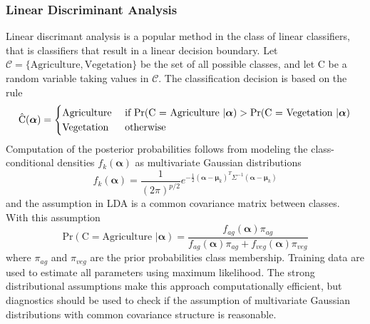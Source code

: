 \subsubsection{Linear Discriminant Analysis} %
\label{sub:LDA}
Linear discrimant analysis is a popular method in the class of linear classifiers, that is classifiers that result in a linear decision boundary. Let $\mathcal{C} = \{ \text{Agriculture}, \text{Vegetation}\}$ be the set of all possible classes, and let C be a random variable taking values in $\mathcal{C}$. The classification decision is based on the rule
\begin{equation}
	\hat{\text{C}}(\boldsymbol{\alpha}) = 
	\begin{cases}
			\text{Agriculture} \hfill & \text{ if } \text{Pr}(\text{C = Agriculture }| \boldsymbol{\alpha})> \text{Pr}(\text{C = Vegetation }| \boldsymbol{\alpha})\\
			\text{Vegetation} \hfill & \text{ otherwise}
	\end{cases}
\end{equation}  
Computation of the posterior probabilities follows from modeling the class-conditional densities $f_k(\boldsymbol\alpha)$ as multivariate Gaussian distributions
\begin{equation}
	f_k(\boldsymbol\alpha) = \frac{1}{(2\pi)^{p/2}}e^{-\frac{1}{2}(\boldsymbol\alpha - \boldsymbol\mu_k)^T\Sigma^{-1}(\boldsymbol\alpha - \boldsymbol\mu_k)}
\end{equation}
and the assumption in LDA is a common covariance matrix between classes. With this assumption 
\begin{equation}
	\text{Pr}(\text{C} = \text{Agriculture } | \boldsymbol\alpha) = \frac{f_{ag}(\boldsymbol\alpha)\pi_{ag}}{f_{ag}(\boldsymbol\alpha)\pi_{ag}+f_{veg}(\boldsymbol\alpha)\pi_{veg}}
\end{equation}
where $\pi_{ag}$ and $\pi_{veg}$ are the prior probabilities class membership. Training data are used to estimate all parameters using maximum likelihood. The strong distributional assumptions make this approach computationally efficient, but diagnostics should be used to check if the assumption of multivariate Gaussian distributions with common covariance structure is reasonable. 

